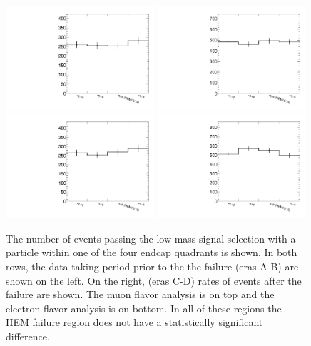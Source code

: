 \begin{figure}[!tp]
\label{fig:hemfailure}
    \centering
    \includegraphics[width=0.49\textwidth]{figures/HEM1516/SingleMuon_AB_BoostedLowWRSR.pdf}
    \includegraphics[width=0.49\textwidth]{figures/HEM1516/SingleMuon_CD_BoostedLowWRSR.pdf}
    \\
    \includegraphics[width=0.49\textwidth]{figures/HEM1516/EGamma_AB_BoostedLowWRSR.pdf}
    \includegraphics[width=0.49\textwidth]{figures/HEM1516/EGamma_CD_BoostedLowWRSR.pdf}
    
    \caption[
       Event rate in the four complimentary quadrants of the endcap in eras of 2018.
    ]{
        The number of events passing the low mass signal selection with a particle within one of the four endcap quadrants is shown. In both rows, the data taking period prior to the the failure (eras A-B) are shown on the left. On the right, (eras C-D) rates of events after the failure are shown. The muon flavor analysis is on top and the electron flavor analysis is on bottom. In all of these regions the HEM failure region does not have a statistically significant difference.
    }
\end{figure}

